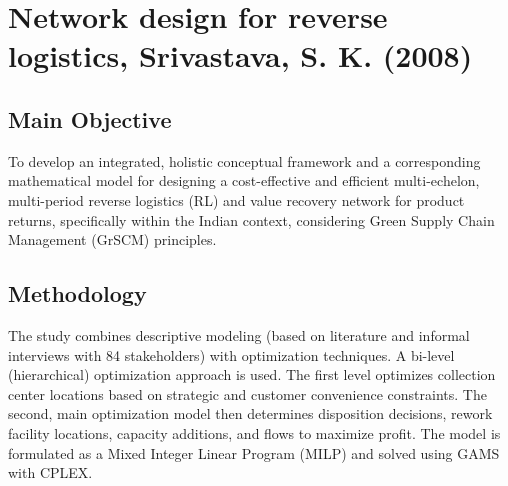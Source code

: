 
\section{{Network design for reverse logistics, Srivastava, S. K. (2008)}}

\subsection*{Main Objective}
To develop an integrated, holistic conceptual framework and a corresponding mathematical model for designing a cost-effective and efficient multi-echelon, multi-period reverse logistics (RL) and value recovery network for product returns, specifically within the Indian context, considering Green Supply Chain Management (GrSCM) principles.

\subsection*{Methodology}
The study combines descriptive modeling (based on literature and informal interviews with 84 stakeholders) with optimization techniques. A bi-level (hierarchical) optimization approach is used. The first level optimizes collection center locations based on strategic and customer convenience constraints. The second, main optimization model then determines disposition decisions, rework facility locations, capacity additions, and flows to maximize profit. The model is formulated as a Mixed Integer Linear Program (MILP) and solved using GAMS with CPLEX.

